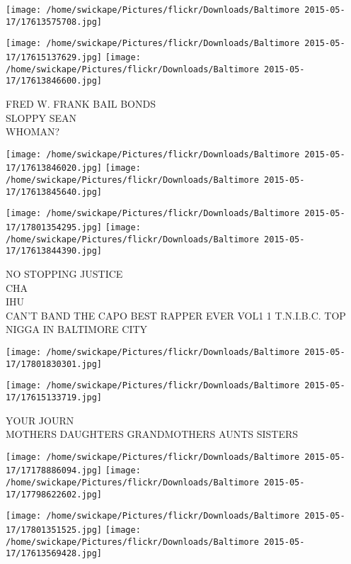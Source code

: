 \documentclass[10pt,letterpaper]{article}
\begin{document}
\texttt{[image: /home/swickape/Pictures/flickr/Downloads/Baltimore 2015-05-17/17613575708.jpg]}

\vspace{0.25in}
\texttt{[image: /home/swickape/Pictures/flickr/Downloads/Baltimore 2015-05-17/17615137629.jpg]}
\texttt{[image: /home/swickape/Pictures/flickr/Downloads/Baltimore 2015-05-17/17613846600.jpg]}

FRED W. FRANK BAIL BONDS\\
SLOPPY SEAN\\
WHOMAN?\\
\pagebreak

\texttt{[image: /home/swickape/Pictures/flickr/Downloads/Baltimore 2015-05-17/17613846020.jpg]}
\texttt{[image: /home/swickape/Pictures/flickr/Downloads/Baltimore 2015-05-17/17613845640.jpg]}

\texttt{[image: /home/swickape/Pictures/flickr/Downloads/Baltimore 2015-05-17/17801354295.jpg]}
\texttt{[image: /home/swickape/Pictures/flickr/Downloads/Baltimore 2015-05-17/17613844390.jpg]}

NO STOPPING JUSTICE\\
CHA\\
IHU\\
CAN'T BAND THE CAPO BEST RAPPER EVER VOL1 1 T.N.I.B.C. TOP NIGGA IN BALTIMORE CITY\\
\pagebreak

\texttt{[image: /home/swickape/Pictures/flickr/Downloads/Baltimore 2015-05-17/17801830301.jpg]}

\vspace{0.25in}
\texttt{[image: /home/swickape/Pictures/flickr/Downloads/Baltimore 2015-05-17/17615133719.jpg]}

YOUR JOURN\\
MOTHERS DAUGHTERS GRANDMOTHERS AUNTS SISTERS\\
\pagebreak

\texttt{[image: /home/swickape/Pictures/flickr/Downloads/Baltimore 2015-05-17/17178886094.jpg]}
\texttt{[image: /home/swickape/Pictures/flickr/Downloads/Baltimore 2015-05-17/17798622602.jpg]}

\texttt{[image: /home/swickape/Pictures/flickr/Downloads/Baltimore 2015-05-17/17801351525.jpg]}
\texttt{[image: /home/swickape/Pictures/flickr/Downloads/Baltimore 2015-05-17/17613569428.jpg]}
\end{document}
